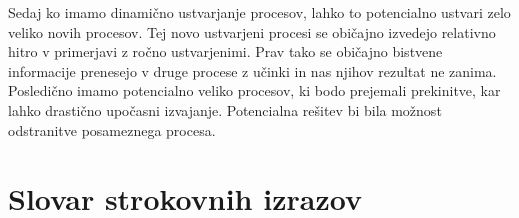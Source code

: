 Sedaj ko imamo dinamično ustvarjanje procesov, lahko to potencialno ustvari zelo veliko novih procesov.
Tej novo ustvarjeni procesi se običajno izvedejo relativno hitro v primerjavi z ročno ustvarjenimi.
Prav tako se običajno bistvene informacije prenesejo v druge procese z učinki in nas njihov rezultat ne zanima.
Posledično imamo potencialno veliko procesov, ki bodo prejemali prekinitve, kar lahko drastično upočasni izvajanje.
Potencialna rešitev bi bila možnost odstranitve posameznega procesa.

\section*{Slovar strokovnih izrazov}





